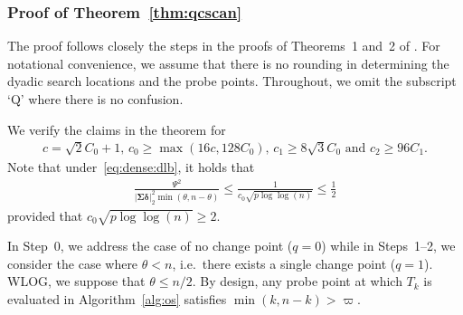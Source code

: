 \documentclass[11pt, a4paper]{article}
\newcommand{\mc}{\mathcal}
\renewcommand{\l}{\left}
\renewcommand{\r}{\right}
\newcommand{\cp}{\theta}
\theoremstyle{definition}
\theoremstyle{definition}
\theoremstyle{definition}
\theoremstyle{definition}
\theoremstyle{definition}
\theoremstyle{remark}
\theoremstyle{definition}
\theoremstyle{definition}
\theoremstyle{definition}
\begin{document}
\subsubsection{Proof of Theorem~\ref{thm:qcscan}}

The proof follows closely the steps in the proofs of Theorems~1 and~2 of \cite{kovacs2024optimistic}.
For notational convenience, we assume that there is no rounding in determining the dyadic search locations and the probe points.
Throughout, we omit the subscript `Q' where there is no confusion.

We verify the claims in the theorem for
\begin{align}
c = \sqrt{2} C_0 + 1, \, 
c_0 \ge \max(16c, 128 C_0), \,
c_1 \ge 8\sqrt{3} C_0 \text{ \ and \ }
c_2 \ge 96 C_1.
\label{eq:const}
\end{align}
Note that under~\eqref{eq:dense:dlb}, it holds that
\begin{align}
\frac{\Psi^2}{\vert \bm\Sigma \bm\delta \vert_2^2 \min(\cp, n - \cp)} \le \frac{1}{c_0\sqrt{p \log\log(n)}} \le \frac{1}{2}
\label{eq:delta:beta}
\end{align}
provided that $c_0 \sqrt{p\log\log(n)} \ge 2$.

In Step~0, we address the case of no change point ($q = 0$) while in Steps~1--2, we consider the case where $\cp < n$, i.e.\ there exists a single change point ($q = 1$).
WLOG, we suppose that $\cp \le n / 2$. 
By design, any probe point at which $T_k$ is evaluated in Algorithm~\ref{alg:os} satisfies $\min(k, n - k) > \varpi$.
\end{document}
